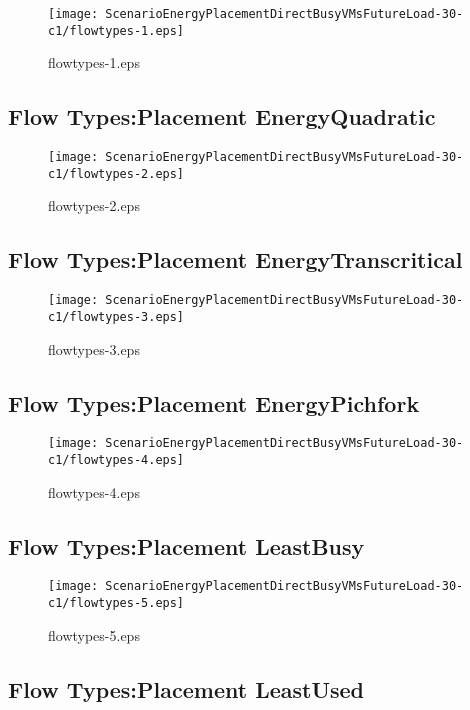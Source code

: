\documentclass{elsart}
\begin{document}
\begin{figure}[ht]
\centering
\texttt{[image: ScenarioEnergyPlacementDirectBusyVMsFutureLoad-30-c1/flowtypes-1.eps]}
\caption{flowtypes-1.eps}\label{fig:flowtypes-1}
\end{figure}

\clearpage
\subsection{Flow Types:Placement EnergyQuadratic}

\begin{figure}[ht]
\centering
\texttt{[image: ScenarioEnergyPlacementDirectBusyVMsFutureLoad-30-c1/flowtypes-2.eps]}
\caption{flowtypes-2.eps}\label{fig:flowtypes-2}
\end{figure}

\clearpage
\subsection{Flow Types:Placement EnergyTranscritical}

\begin{figure}[ht]
\centering
\texttt{[image: ScenarioEnergyPlacementDirectBusyVMsFutureLoad-30-c1/flowtypes-3.eps]}
\caption{flowtypes-3.eps}\label{fig:flowtypes-3}
\end{figure}

\clearpage
\subsection{Flow Types:Placement EnergyPichfork}

\begin{figure}[ht]
\centering
\texttt{[image: ScenarioEnergyPlacementDirectBusyVMsFutureLoad-30-c1/flowtypes-4.eps]}
\caption{flowtypes-4.eps}\label{fig:flowtypes-4}
\end{figure}

\clearpage
\subsection{Flow Types:Placement LeastBusy}

\begin{figure}[ht]
\centering
\texttt{[image: ScenarioEnergyPlacementDirectBusyVMsFutureLoad-30-c1/flowtypes-5.eps]}
\caption{flowtypes-5.eps}\label{fig:flowtypes-5}
\end{figure}

\clearpage
\subsection{Flow Types:Placement LeastUsed}
\end{document}
